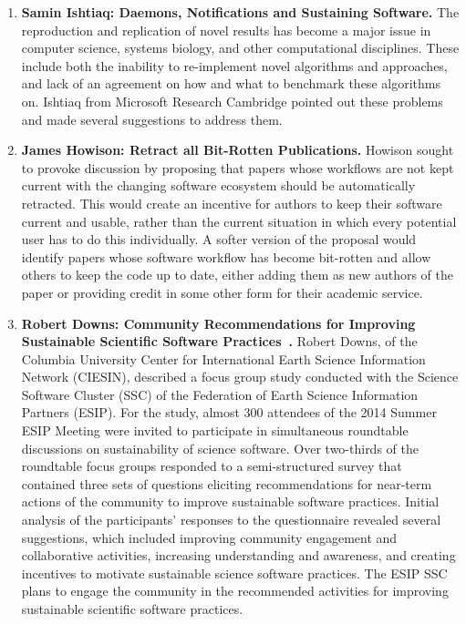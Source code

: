 \documentclass[11pt, oneside]{amsart}
\begin{document}
\begin{enumerate}
\item \textbf{Samin Ishtiaq: Daemons, Notifications and Sustaining Software. }%
The reproduction and replication of novel results has become a major issue in
computer science, systems biology, and other computational disciplines. These
include both the inability to re-implement novel algorithms and approaches, and
lack of an agreement on how and what to benchmark these algorithms on. Ishtiaq
from Microsoft Research Cambridge pointed out these problems and made several
suggestions to address them.

\item \textbf{James Howison: Retract all Bit-Rotten Publications. }%
Howison sought to provoke discussion by proposing that papers whose workflows
are not kept current with the changing software ecosystem should be
automatically retracted. This would create an incentive for authors to keep
their software current and usable, rather than the current situation in which
every potential user has to do this individually. A softer version of the
proposal would identify papers whose software workflow has become bit-rotten and
allow others to keep the code up to date, either adding them as new authors of
the paper or providing credit in some other form for their academic service.




\item \textbf{Robert Downs: Community Recommendations for Improving Sustainable
Scientific Software Practices~\cite{Downs_poster}.} Robert Downs, of the
Columbia University Center for International Earth Science Information Network
(CIESIN), described a focus group study conducted with the Science Software
Cluster (SSC) of the Federation of Earth Science Information Partners (ESIP).
For the study, almost 300 attendees of the 2014 Summer ESIP Meeting were invited
to participate in simultaneous roundtable discussions on sustainability of
science software. Over two-thirds of the roundtable focus groups responded to a
semi-structured survey that contained three sets of questions eliciting
recommendations for near-term actions of the community to improve sustainable
software practices. Initial analysis of the participants' responses to the
questionnaire revealed several suggestions, which included improving community
engagement and collaborative activities, increasing understanding and awareness,
and creating incentives to motivate sustainable science software practices. The
ESIP SSC plans to engage the community in the recommended activities for
improving sustainable scientific software practices.


\end{enumerate}
\end{document}
